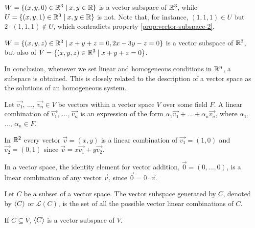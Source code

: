 \begin{example}
    $W = \{\left( x, y, 0 \right)\in \R^3\st x, y\in\R\} $ is a vector subspace of $\R^3$, while $U = \{\left( x, y, 1 \right) \in\R^3\st x, y\in\R\} $ is not. Note that, for instance, $\left( 1, 1, 1 \right)\in U$ but
    $2\cdot\left( 1, 1, 1 \right) \not\in U$, which contradicts property \ref{prop:vector-subspace-2}.
\end{example}

\begin{example}
    $W = \{\left( x, y, z \right) \in\R^3\st x + y + z = 0, 2x - 3y - z = 0\} $ is a vector subspace of $\R^3$,
    but also of $V = \{\left( x, y, z \right) \in\R^3\st x + y + z = 0\} $.
\end{example}

In conclusion, whenever we set linear and homogeneous conditions in $\Rtn$, a subspace is obtained. This is
closely related to the description of a vector space as the solutions of an homogeneous system.

\begin{defn}
    Let $\vec{v_1}$, $\ldots$, $\vec{v_n}\in V$ be vectors within a vector space $V$ over some field $F$.
    A linear combination of $\vec{v_1}$, $\ldots$, $\vec{v_n}$ is an expression of the form $\alpha_1
    \vec{v_1} + \ldots + \alpha_n\vec{v_n}$, where  $\alpha_1$, $\ldots$, $\alpha_n\in F$.
\end{defn}

\begin{example}
    In $\R^2$ every vector $\vec{v} = \left(x, y\right)$ is a linear combination of $\vec{v_1} =
    \left( 1, 0 \right) $ and $\vec{v_2} = \left( 0, 1 \right) $ since $\vec{v} = x\vec{v_1} + y\vec{v_2}$.
\end{example}

\begin{prop}
    In a vector space, the identity element for vector addition, $\vec{0} = \left( 0, \ldots, 0 \right) $, is
    a linear combination of any vector $\vec{v}$, since $\vec{0} = 0\cdot\vec{v}$.
\end{prop}

\begin{defn}
    Let $C$ be a subset of a vector space. The vector subspace generated by $C$, denoted by $\langle C \rangle$ or
    $\mathcal{L}\left( C \right) $, is the set of all the possible vector linear combinations of $C$.
\end{defn}

\begin{prop}
    If $C\subseteq V$, $\langle C \rangle$ is a vector subspace of $V$.
\end{prop}

